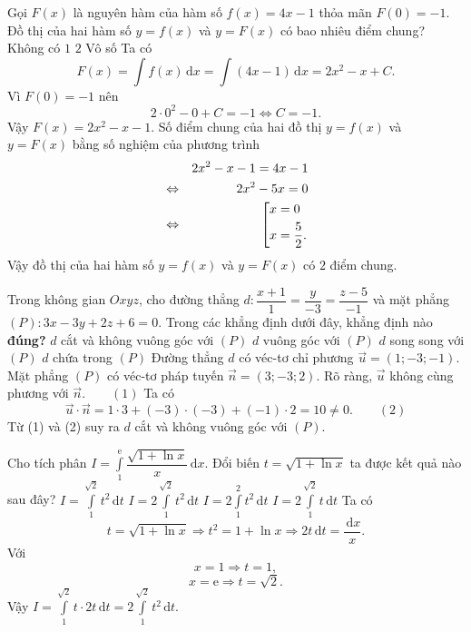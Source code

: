 \begin{ex}%
	Gọi $F(x)$ là nguyên hàm của hàm số $f(x)=4x-1$ thỏa mãn $F(0)=-1$. Đồ thị của hai hàm số $y=f(x)$ và $y=F(x)$ có bao nhiêu điểm chung?
	\choice
	{Không có}
	{$1$}
	{\True $2$}
	{Vô số}
	\loigiai
	{
		Ta có 
		\[F(x)=\displaystyle\int f(x)\mathrm{\,d}x=\displaystyle\int (4x-1)\mathrm{\,d}x=2x^2-x+C.\]
		Vì $F(0)=-1$ nên 
		\[2\cdot0^2-0+C=-1\Leftrightarrow C=-1.\]
		Vậy $F(x)=2x^2-x-1$.
		Số điểm chung của hai đồ thị $y=f(x)$ và $y=F(x)$ bằng số nghiệm của phương trình
		\begin{eqnarray*}
			& &2x^2-x-1=4x-1 \\
			& \Leftrightarrow & 2x^2-5x=0\\
			& \Leftrightarrow & \left[\begin{aligned}&x=0\\&x=\dfrac{5}{2}.\end{aligned}\right.
		\end{eqnarray*}
	Vậy đồ thị của hai hàm số $y=f(x)$ và $y=F(x)$ có $2$ điểm chung.
	}
\end{ex}

\begin{ex}%
	Trong không gian $Oxyz$, cho đường thẳng $d\colon\dfrac{x+1}{1}=\dfrac{y}{-3}=\dfrac{z-5}{-1}$ và mặt phẳng $(P)\colon3x-3y+2z+6=0$. Trong các khẳng định dưới đây, khẳng định nào \textbf{đúng?}
	\choice
	{\True $d$ cắt và không vuông góc với $(P)$}
	{$d$ vuông góc với $(P)$}
	{$d$ song song với $(P)$}
	{$d$ chứa trong $(P)$}
	\loigiai
	{
		Đường thẳng $d$ có véc-tơ chỉ phương $\vec{u}=(1;-3;-1)$.\\
		Mặt phẳng $(P)$ có véc-tơ pháp tuyến $\vec{n}=(3;-3;2)$.
		Rõ ràng, $\vec{u}$ không cùng phương với $\vec{n}.\qquad(1)$
		Ta có 
		\[\vec{u}\cdot\vec{n}=1\cdot3+(-3)\cdot(-3)+(-1)\cdot2=10\ne0.\qquad(2)\]
		Từ (1) và (2) suy ra $d$ cắt và không vuông góc với $(P)$.
	}
\end{ex}

\begin{ex}%
	Cho tích phân $I=\displaystyle\int\limits_1^\mathrm{e}\dfrac{\sqrt{1+\ln x}}{x}\mathrm{\,d}x$. Đổi biến $t=\sqrt{1+\ln x}$ ta được kết quả nào sau đây?
	\choice
	{$I=\displaystyle\int\limits_1^{\sqrt{2}} t^2\mathrm{\,d}t$}
	{\True $I=2\displaystyle\int\limits_1^{\sqrt{2}} t^2\mathrm{\,d}t$}
	{$I=2\displaystyle\int\limits_1^2 t^2\mathrm{\,d}t$}
	{$I=2\displaystyle\int\limits_1^{\sqrt{2}} t\mathrm{\,d}t$}
	\loigiai
	{
		Ta có 
		\[t=\sqrt{1+\ln x}\Rightarrow t^2=1+\ln x \Rightarrow  2t\mathrm{\,d}t=\dfrac{\mathrm{\,d}x}{x}.\]
		Với 
		\[x=1\Rightarrow t=1,\]
		\[x=\mathrm{e}\Rightarrow t=\sqrt{2}.\]
		Vậy $I=\displaystyle\int\limits_1^{\sqrt{2}}t\cdot2t\mathrm{\,d}t=2\displaystyle\int\limits_1^{\sqrt{2}} t^2\mathrm{\,d}t$.
	}
\end{ex}

